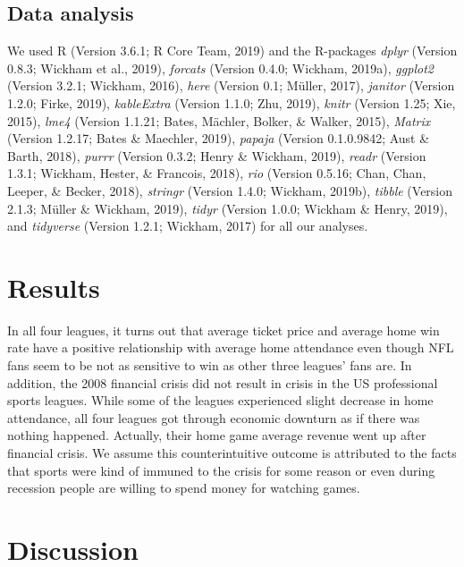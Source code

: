 \documentclass[man, fleqn, noextraspace,floatsintext]{apa6}
\begin{document}
\hypertarget{data-analysis}{%
\subsection{Data analysis}\label{data-analysis}}

We used R (Version 3.6.1; R Core Team, 2019) and the R-packages \emph{dplyr} (Version 0.8.3; Wickham et al., 2019), \emph{forcats} (Version 0.4.0; Wickham, 2019a), \emph{ggplot2} (Version 3.2.1; Wickham, 2016), \emph{here} (Version 0.1; Müller, 2017), \emph{janitor} (Version 1.2.0; Firke, 2019), \emph{kableExtra} (Version 1.1.0; Zhu, 2019), \emph{knitr} (Version 1.25; Xie, 2015), \emph{lme4} (Version 1.1.21; Bates, Mächler, Bolker, \& Walker, 2015), \emph{Matrix} (Version 1.2.17; Bates \& Maechler, 2019), \emph{papaja} (Version 0.1.0.9842; Aust \& Barth, 2018), \emph{purrr} (Version 0.3.2; Henry \& Wickham, 2019), \emph{readr} (Version 1.3.1; Wickham, Hester, \& Francois, 2018), \emph{rio} (Version 0.5.16; Chan, Chan, Leeper, \& Becker, 2018), \emph{stringr} (Version 1.4.0; Wickham, 2019b), \emph{tibble} (Version 2.1.3; Müller \& Wickham, 2019), \emph{tidyr} (Version 1.0.0; Wickham \& Henry, 2019), and \emph{tidyverse} (Version 1.2.1; Wickham, 2017) for all our analyses.

\hypertarget{results}{%
\section{Results}\label{results}}

In all four leagues, it turns out that average ticket price and average home win rate have a positive relationship with average home attendance even though NFL fans seem to be not as sensitive to win as other three leagues' fans are. In addition, the 2008 financial crisis did not result in crisis in the US professional sports leagues. While some of the leagues experienced slight decrease in home attendance, all four leagues got through economic downturn as if there was nothing happened. Actually, their home game average revenue went up after financial crisis. We assume this counterintuitive outcome is attributed to the facts that sports were kind of immuned to the crisis for some reason or even during recession people are willing to spend money for watching games.

\hypertarget{discussion}{%
\section{Discussion}\label{discussion}}
\end{document}
